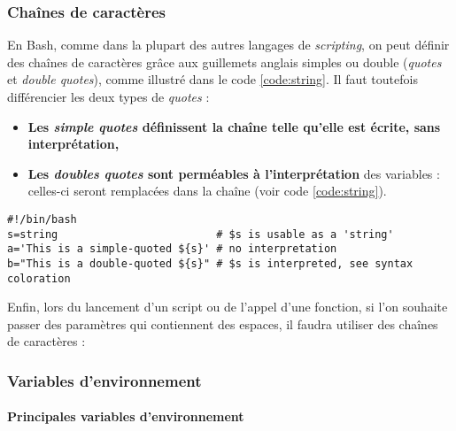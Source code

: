 \newpage

\subsubsection{Chaînes de caractères} \label{sec:string}
En Bash, comme dans la plupart des autres langages de \textit{scripting}, on peut définir des chaînes de caractères grâce aux guillemets anglais simples ou double (\textit{quotes} et \textit{double quotes}), comme illustré dans le code \ref{code:string}. Il faut toutefois différencier les deux types de \textit{quotes} : 
\begin{itemize}
    \item \textbf{Les \textit{simple quotes} définissent la chaîne telle qu'elle est écrite, sans interprétation,}
    \item \textbf{Les \textit{doubles quotes} sont perméables à l'interprétation} des variables : celles-ci seront remplacées dans la chaîne (voir code \ref{code:string}).
\end{itemize}

\vspace{5mm}
\begin{code}
    \begin{verbatim}
#!/bin/bash
s=string                         # $s is usable as a 'string'
a='This is a simple-quoted ${s}' # no interpretation
b="This is a double-quoted ${s}" # $s is interpreted, see syntax coloration
    \end{verbatim}

    \vspace{-0.5cm}
    \label{code:string}
\end{code}

Enfin, lors du lancement d'un script ou de l'appel d'une fonction, si l'on souhaite passer des paramètres qui contiennent des espaces, il faudra utiliser des chaînes de caractères : 

\subsubsection{Variables d'environnement}

\paragraph{Principales variables d'environnement} \label{sec:env}

